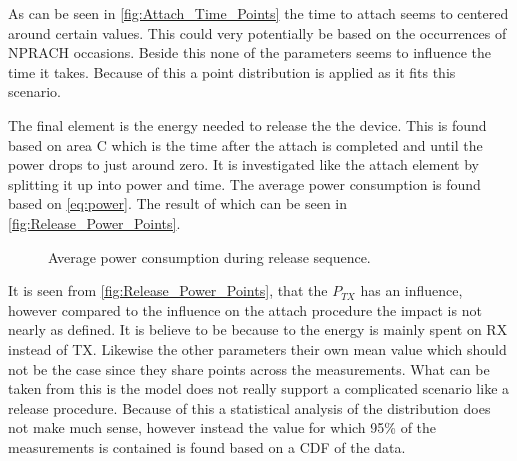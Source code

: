 As can be seen in \autoref{fig:Attach_Time_Points} the time to attach seems to centered around certain values. This could very potentially be based on the occurrences of NPRACH occasions. Beside this none of the parameters seems to influence the time it takes. Because of this a point distribution is applied as it fits this scenario. 

The final element is the energy needed to release the the device. This is found based on area C which is the time after the attach is completed and until the power drops to just around zero. It is investigated like the attach element by splitting it up into power and time. The average power consumption is found based on \autoref{eq:power}. The result of which can be seen in \autoref{fig:Release_Power_Points}.

\begin{figure}[H]
\centering
\begin{minipage}{0.48\textwidth}
\resizebox{\textwidth}{!}{
}
\end{minipage}
\hfill
\begin{minipage}{0.48\textwidth}
\resizebox{\textwidth}{!}{
}
\end{minipage}
\caption{Average power consumption during release sequence.}
\label{fig:Release_Power_Points}
\end{figure}

It is seen from \autoref{fig:Release_Power_Points}, that the $P_{TX}$ has an influence, however compared to the influence on the attach procedure the impact is not nearly as defined. It is believe to be because to the energy is mainly spent on RX instead of TX. Likewise the other parameters their own mean value which should not be the case since they share points across the measurements. What can be taken from this is the model does not really support a complicated scenario like a release procedure. Because of this a statistical analysis of the distribution does not make much sense, however instead the value for which 95\% of the measurements is contained is found based on a CDF of the data. 

